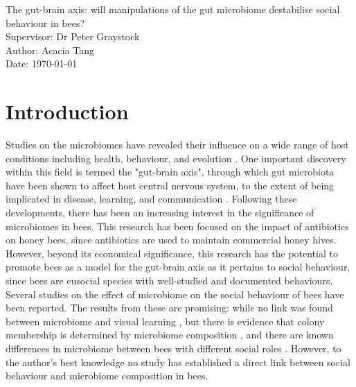 \documentclass[10pt]{article}
\begin{document}
    \begin{titlepage}\centering
    \vspace*{\fill}
    \LARGE The gut-brain axis: will manipulations of the gut microbiome destabilise social behaviour in bees?\\
    \vspace{\baselineskip}
    \LARGE Supervisor: Dr Peter Graystock\\
    \vspace{\baselineskip}
    \normalsize Author: Acacia Tang\\
    \normalsize Date: {\today}
    \vspace*{\fill}
    \end{titlepage}

    \newpage
    \section{Introduction}
        Studies on the microbiomes have revealed their influence on a wide range of host conditions including health, behaviour, and evolution
        \cite{archie2015social}.
        One important discovery within this field is termed the "gut-brain axis",
        through which gut microbiota have been shown to affect host central nervous system,
        to the extent of being implicated in disease, learning, and communication
        \cite{archie2015social}.
        Following these developments,
        there has been an increasing interest in the significance of microbiomes in bees.
        This research has been focused on the impact of antibiotics on honey bees, since antibiotics are used to maintain commercial honey hives.
        However, beyond its economical significance, this research has the potential to promote bees as a model for the gut-brain axis as it pertains to social behaviour,
        since bees are eusocial species with well-studied and documented behaviours.
        Several studies on the effect of microbiome on the social behaviour of bees have been reported.
        The results from these are promising: while no link was found between microbiome and visual learning
        \cite{leger2020gut},
        but there is evidence that colony membership is determined by microbiome composition
        \cite{vernier2020gut},
        and there are known differences in microbiome between bees with different social roles
        \cite{jones2018gut}.
        However, to the author's best knowledge no study has established a direct link between social behaviour and microbiome composition in bees.
      
\end{document}
